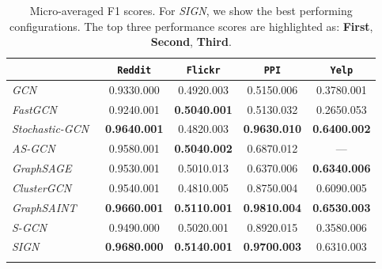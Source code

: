 \documentclass{article}
\begin{document}
\begin{table*}[t]
\caption{Micro-averaged F1 scores. 
For \textit{SIGN}, we show the best performing configurations. 
    The top three performance scores are highlighted as: {\bf \bf \color{red} First}, {\bf \bf \color{violet} Second}, {\bf Third}. 
    }
    \label{tab:results_inductive}
    \centering
        \begin{tabular}{| l | cccc |}
        \hline
         & \texttt{Reddit} & \texttt{Flickr} & \texttt{PPI} & \texttt{Yelp} \\ \hline
        \textit{GCN}~\cite{kipf2016semi} & 0.9330.000 & 0.4920.003 & 0.5150.006 & 0.3780.001\\
        \textit{FastGCN}~\cite{fastgcn} & 0.9240.001 &  {\bf 0.5040.001} & 0.5130.032 & 0.2650.053\\
        \textit{Stochastic-GCN}~\cite{stochastic-training} & {\bf 0.9640.001} &  0.4820.003 & {\bf 0.9630.010} & {\bf \color{violet} 0.6400.002}\\
        \textit{AS-GCN}~\cite{adaptive-sampling} & 0.9580.001 &  {\bf 0.5040.002} & 0.6870.012 & ---\\
        \textit{GraphSAGE}~\cite{GraphSAGE} & 0.9530.001 &  0.5010.013 & 0.6370.006 & \textbf{0.6340.006}\\ 
        \textit{ClusterGCN}~\cite{Chiang:2019:CEA:3292500.3330925} & 0.9540.001 &  0.4810.005 & 0.8750.004 & 0.6090.005 \\ 
        \textit{GraphSAINT}~\cite{DBLP:journals/corr/abs-1907-04931} & {\bf \color{violet} 0.9660.001} & {\bf \color{violet} 0.5110.001} & {\bf \color{red} 0.9810.004} & {\bf \color{red} 0.6530.003} \\
\textit{S-GCN}~\cite{pmlr-v97-wu19e} & 0.9490.000 & 0.5020.001 & 0.8920.015 & 0.3580.006\\\hline
        \textit{SIGN} & {\bf \color{red} 0.9680.000} & {\bf \color{red} 0.5140.001} & {\bf \color{violet} 0.9700.003} & 0.6310.003\\ &  &  &  &  \\


        \hline
    \end{tabular} 
\end{table*}
\end{document}
